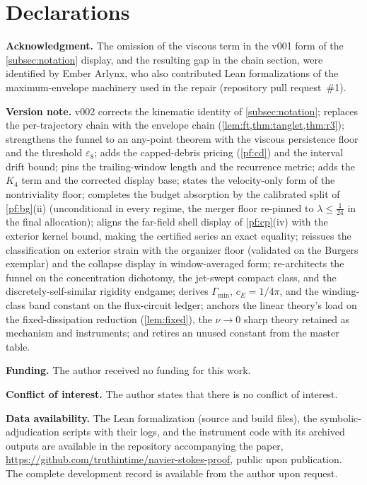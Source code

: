 \documentclass[11pt,letterpaper]{amsart}
\theoremstyle{definition}
\theoremstyle{remark}
\begin{document}
\section*{Declarations}

\noindent\textbf{Acknowledgment.} The omission of the viscous term in the v001
form of the \cref{subsec:notation} display, and the resulting gap in the chain
section, were identified by Ember Arlynx, who also contributed Lean formalizations
of the maximum-envelope machinery used in the repair (repository pull request~\#1).

\medskip
\noindent\textbf{Version note.} v002 corrects the kinematic identity of
\cref{subsec:notation}; replaces the per-trajectory chain with the envelope chain
(\cref{lem:ft,thm:tanglet,thm:r3}); strengthens the funnel to an any-point theorem
with the viscous persistence floor and the threshold $\varepsilon_8$; adds the
capped-debris pricing (\cref{pf:cd}) and the interval drift bound; pins the
trailing-window length and the recurrence metric; adds the $K_4$ term and the
corrected display base; states the velocity-only form of the nontriviality floor;
completes the budget absorption by the calibrated split of \cref{pf:bg}(ii)
(unconditional in every regime, the merger floor re-pinned to
$\lambda\le\tfrac1{24}$ in the final allocation); aligns the far-field shell
display of \cref{pf:cp}(iv)
with the exterior kernel bound, making the certified series an exact equality;
reissues the classification on exterior strain with the organizer floor
(validated on the Burgers exemplar) and the collapse display in
window-averaged form; re-architects the funnel on the concentration
dichotomy, the jet-swept compact class, and the discretely-self-similar
rigidity endgame; derives $\Gamma_{\min}$, $c_E=1/4\pi$, and the
winding-class band constant on the flux-circuit ledger; anchors the linear
theory's load on the fixed-dissipation reduction (\cref{lem:fixed}), the
$\nu\to0$ sharp theory retained as mechanism and instruments; and retires
an unused constant from the master table.

\medskip
\noindent\textbf{Funding.} The author received no funding for this work.

\smallskip
\noindent\textbf{Conflict of interest.} The author states that there is no conflict
of interest.

\smallskip
\noindent\textbf{Data availability.} The Lean formalization (source and build
files), the symbolic-adjudication scripts with their logs, and the instrument code
with its archived outputs are available in the repository accompanying the paper,
\url{https://github.com/truthintime/navier-stokes-proof}, public upon publication.
The complete development record is available from the author upon request.
\end{document}
